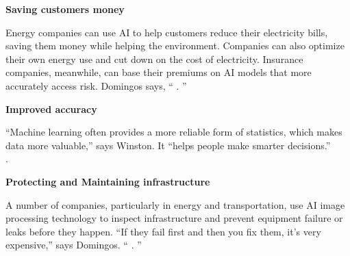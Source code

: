 \textbf{Saving customers money}


Energy companies can use AI to help customers reduce their electricity
bills, saving them money while helping the environment. Companies can
also optimize their own energy use and cut down on the cost of
electricity. Insurance companies, meanwhile, can base their premiums on
AI models that more accurately access risk. Domingos says,  `` \linefill. ''




\textbf{Improved accuracy}


``Machine learning often provides a more reliable form of statistics,
which makes data more valuable,'' says Winston. It ``helps people make
smarter decisions.'' \\
\linefill.


\textbf{Protecting and Maintaining  infrastructure}


A number of companies, particularly in energy and transportation, use AI
image processing technology to inspect infrastructure and prevent
equipment failure or leaks before they happen. ``If they fail first and
then you fix them, it's very expensive,'' says Domingos. `` \linefill. ''



